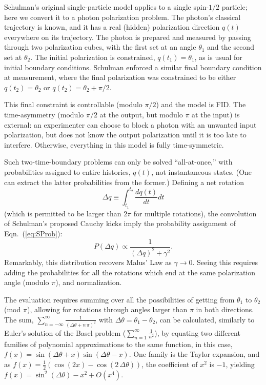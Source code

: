 \documentclass[onecolumn, nofootinbib, 12pt]{revtex4-1}
\begin{document}
Schulman's original single-particle model applies to a single spin-$1/2$ particle; here we convert it to a photon polarization problem.  The photon's classical trajectory is known, and it has a real (hidden) polarization direction $q(t)$ everywhere on its trajectory.  The photon is prepared and measured {by} passing through two polarization cubes, with the first set at an angle $\theta_1$ and the second set at $\theta_2$.  The initial polarization is constrained, $q(t_1)=\theta_1$, as is usual for initial boundary conditions.  Schulman enforced a similar final boundary condition at measurement, where the final polarization was constrained to be either $q(t_2)=\theta_2$ or $q(t_2)=\theta_2+\pi/2$.  

This final constraint is controllable (modulo $\pi/2$) and the model is FID.  The time-asymmetry (modulo $\pi/2$ at the output, but modulo $\pi$ at the input) is external: an experimenter can choose to block a photon with an unwanted input polarization, but does not know the output polarization until it is too late to interfere.  Otherwise, everything in this model is fully time-symmetric. 

Such two-time-boundary problems can only be solved ``all-at-once,'' with probabilities assigned to entire histories, $q(t)$, not instantaneous states.  (One can extract the latter probabilities from the former.)  Defining a net rotation 
\begin{equation}
\label{eq:Dl}
\Delta q\equiv\int^{t_2}_{t_1} \frac { d q(t)}{dt} dt
\end{equation}
(which is permitted to be larger than $2\pi$ for multiple rotations), the convolution of Schulman's proposed Cauchy kicks imply the probability assignment of Eqn.~(\ref{eq:SProb}):
\begin{equation}
\label{eq:SProbA}
P(\Delta q)\propto\frac{1}{(\Delta q)^2+\gamma^2}.
\end{equation}
Remarkably, this distribution recovers Malus' Law as $\gamma\to0$. Seeing this requires adding the probabilities for all the rotations which end at the same polarization angle (modulo $\pi$), and normalization.

The evaluation requires summing over all the possibilities of getting from $\theta_1$ to $\theta_2$(mod $\pi$), allowing for rotations through angles larger than $\pi$ in both directions.  The sum, 
$\sum _{n=-\infty }^{\infty } \frac{1}{( \Delta\theta + n\,\pi )^{2}}$
with $\Delta\theta = \theta_1 - \theta_2$,
can be calculated, similarly to Euler's solution of the Basel problem ($\sum _{n=1 }^{\infty } \frac{1}{n^{2}}$), by equating two different families of polynomial approximations to the same function, in this case, 
$f(x)=\sin(\Delta\theta+x) \sin(\Delta\theta-x)$.  
One family is the Taylor expansion, and as 
$f(x)=\frac{1}{2} \left( \cos(2x) - \cos(2 \, \Delta\theta) \right)$, the coefficient of $x^2$ is $-1$, yielding $f(x) = \sin^2(\Delta\theta) - x^2 +O(x^4)$.
\end{document}
